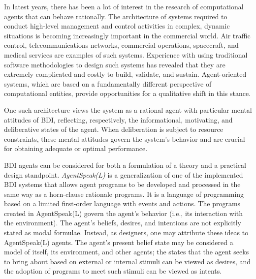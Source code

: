 \vspace{.5cm}

In latest years, there has been a lot of interest in the research of computational agents that can behave rationally. The architecture of systems required to conduct high-level management and control activities in complex, dynamic situations is becoming increasingly important in the commercial world. Air traffic control, telecommunications networks, commercial operations, spacecraft, and medical services are examples of such systems. Experience with using traditional software methodologies to design such systems has revealed that they are extremely complicated and costly to build, validate, and sustain. Agent-oriented systems, which are based on a fundamentally different perspective of computational entities, provide opportunities for a qualitative shift in this stance. 

\vspace{.5cm}

One such architecture views the system as a rational agent with particular mental attitudes of \ac{BDI}, reflecting, respectively, the informational, motivating, and deliberative states of the agent. When deliberation is subject to resource constraints, these mental attitudes govern the system's behavior and are crucial for obtaining adequate or optimal performance.

\vspace{.5cm}

\ac{BDI} agents can be considered for both a formulation of a theory and a practical design standpoint. \textit{AgentSpeak(L)} is a generalization of one of the implemented \ac{BDI} systems that allows agent programs to be developed and processed in the same way as a horn-clause rationale programs. It is a language of programming based on a limited first-order language with events and actions. The programs created in AgentSpeak(L) govern the agent's behavior (i.e., its interaction with the environment). The agent's beliefs, desires, and intentions are not explicitly stated as modal formulae. Instead, as designers, one may attribute these ideas to AgentSpeak(L) agents. The agent's present belief state may be considered a model of itself, its environment, and other agents; the states that the agent seeks to bring about based on external or internal stimuli can be viewed as desires, and the adoption of programs to meet such stimuli can be viewed as intents.

\vspace{.5cm}

